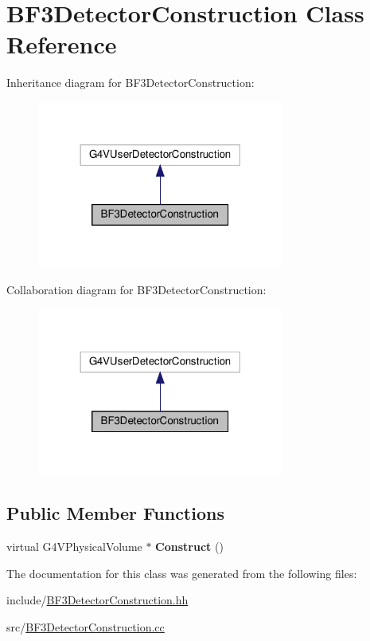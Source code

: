 \hypertarget{classBF3DetectorConstruction}{}\section{B\+F3\+Detector\+Construction Class Reference}
\label{classBF3DetectorConstruction}


Inheritance diagram for B\+F3\+Detector\+Construction\+:
\nopagebreak
\begin{figure}[H]
\begin{center}
\leavevmode
\includegraphics[width=230pt]{classBF3DetectorConstruction__inherit__graph}
\end{center}
\end{figure}


Collaboration diagram for B\+F3\+Detector\+Construction\+:
\nopagebreak
\begin{figure}[H]
\begin{center}
\leavevmode
\includegraphics[width=230pt]{classBF3DetectorConstruction__coll__graph}
\end{center}
\end{figure}
\subsection*{Public Member Functions}
\begin{DoxyCompactItemize}
\item 
\mbox{\label{classBF3DetectorConstruction_af683594ad695382e3e4e1ced109c71cb}} 
virtual G4\+V\+Physical\+Volume $\ast$ {\bfseries Construct} ()
\end{DoxyCompactItemize}


The documentation for this class was generated from the following files\+:\begin{DoxyCompactItemize}
\item 
include/\hyperlink{BF3DetectorConstruction_8hh}{B\+F3\+Detector\+Construction.\+hh}\item 
src/\hyperlink{BF3DetectorConstruction_8cc}{B\+F3\+Detector\+Construction.\+cc}\end{DoxyCompactItemize}

